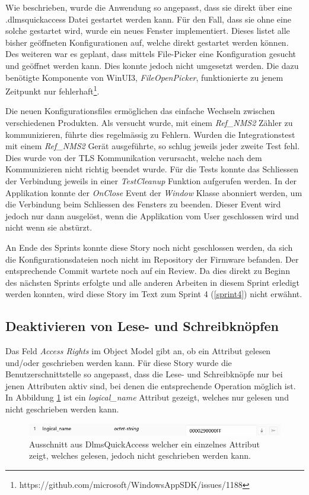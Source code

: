 Wie beschrieben, wurde die Anwendung so angepasst, dass sie direkt über eine .dlmsquickaccess Datei gestartet werden kann.
Für den Fall, dass sie ohne eine solche gestartet wird, wurde ein neues Fenster implementiert.
Dieses listet alle bisher geöffneten Konfigurationen auf, welche direkt gestartet werden können.
Des weiteren war es geplant, dass mittels File-Picker eine Konfiguration gesucht und geöffnet werden kann.
Dies konnte jedoch nicht umgesetzt werden.
Die dazu benötigte Komponente von WinUI3, \textit{FileOpenPicker}, funktionierte zu jenem Zeitpunkt nur fehlerhaft\footnote{https://github.com/microsoft/WindowsAppSDK/issues/1188}.


Die neuen Konfigurationsfiles ermöglichen das einfache Wechseln zwischen verschiedenen Produkten.
Als versucht wurde, mit einem \textit{Ref\_NMS2} Zähler zu kommunizieren, führte dies regelmässig zu Fehlern.
Wurden die Integrationstest mit einem \textit{Ref\_NMS2} Gerät ausgeführte, so schlug jeweils jeder zweite Test fehl.
Dies wurde von der \ac{TLS} Kommunikation verursacht, welche nach dem Kommunizieren nicht richtig beendet wurde.
Für die Tests konnte das Schliessen der Verbindung jeweils in einer \textit{TestCleanup} Funktion aufgerufen werden.
In der Applikation konnte der \textit{OnClose} Event der \textit{Window} Klasse abonniert werden, um die Verbindung beim Schliessen des Fensters zu beenden.
Dieser Event wird jedoch nur dann ausgelöst, wenn die Applikation vom User geschlossen wird und nicht wenn sie abstürzt.


An Ende des Sprints konnte diese Story noch nicht geschlossen werden, da sich die Konfigurationsdateien noch nicht im Repository der Firmware befanden.
Der entsprechende Commit wartete noch auf ein Review.
Da dies direkt zu Beginn des nächsten Sprints erfolgte und alle anderen Arbeiten in diesem Sprint erledigt werden konnten, wird diese Story im Text zum Sprint 4 (\ref{sprint4}) nicht erwähnt.


\subsection{Deaktivieren von Lese- und Schreibknöpfen}
Das Feld \textit{Access Rights} im Object Model gibt an, ob ein Attribut gelesen und/oder geschrieben werden kann.
Für diese Story wurde die Benutzerschnittstelle so angepasst, dass die Lese- und Schreibknöpfe nur bei jenen Attributen aktiv sind, bei denen die entsprechende Operation möglich ist.
In Abbildung \ref{fig:logicalNameAttribute} ist ein \textit{logical\_name} Attribut gezeigt, welches nur gelesen und nicht geschrieben werden kann.

\begin{figure}[H]
   \centering
   \includegraphics[width=1.0\textwidth]{gfx/logicalNameAttribute.png}
   \caption{
      Ausschnitt aus DlmsQuickAccess welcher ein einzelnes Attribut zeigt, welches gelesen, jedoch nicht geschrieben werden kann.
      }
      \label{fig:logicalNameAttribute}
   \end{figure}